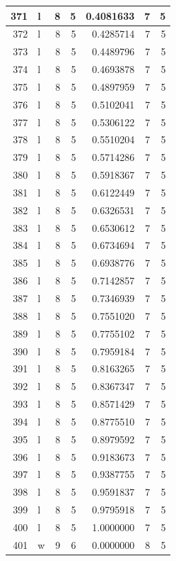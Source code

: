 \documentclass[
  letterpaper,
  DIV=11,
  numbers=noendperiod]{scrreprt}
\begin{document}
\begin{table}
\begin{tabular}[t]{r|l|r|r|r|r|r}
\hline
371 & l & 8 & 5 & 0.4081633 & 7 & 5\\
\hline
372 & l & 8 & 5 & 0.4285714 & 7 & 5\\
\hline
373 & l & 8 & 5 & 0.4489796 & 7 & 5\\
\hline
374 & l & 8 & 5 & 0.4693878 & 7 & 5\\
\hline
375 & l & 8 & 5 & 0.4897959 & 7 & 5\\
\hline
376 & l & 8 & 5 & 0.5102041 & 7 & 5\\
\hline
377 & l & 8 & 5 & 0.5306122 & 7 & 5\\
\hline
378 & l & 8 & 5 & 0.5510204 & 7 & 5\\
\hline
379 & l & 8 & 5 & 0.5714286 & 7 & 5\\
\hline
380 & l & 8 & 5 & 0.5918367 & 7 & 5\\
\hline
381 & l & 8 & 5 & 0.6122449 & 7 & 5\\
\hline
382 & l & 8 & 5 & 0.6326531 & 7 & 5\\
\hline
383 & l & 8 & 5 & 0.6530612 & 7 & 5\\
\hline
384 & l & 8 & 5 & 0.6734694 & 7 & 5\\
\hline
385 & l & 8 & 5 & 0.6938776 & 7 & 5\\
\hline
386 & l & 8 & 5 & 0.7142857 & 7 & 5\\
\hline
387 & l & 8 & 5 & 0.7346939 & 7 & 5\\
\hline
388 & l & 8 & 5 & 0.7551020 & 7 & 5\\
\hline
389 & l & 8 & 5 & 0.7755102 & 7 & 5\\
\hline
390 & l & 8 & 5 & 0.7959184 & 7 & 5\\
\hline
391 & l & 8 & 5 & 0.8163265 & 7 & 5\\
\hline
392 & l & 8 & 5 & 0.8367347 & 7 & 5\\
\hline
393 & l & 8 & 5 & 0.8571429 & 7 & 5\\
\hline
394 & l & 8 & 5 & 0.8775510 & 7 & 5\\
\hline
395 & l & 8 & 5 & 0.8979592 & 7 & 5\\
\hline
396 & l & 8 & 5 & 0.9183673 & 7 & 5\\
\hline
397 & l & 8 & 5 & 0.9387755 & 7 & 5\\
\hline
398 & l & 8 & 5 & 0.9591837 & 7 & 5\\
\hline
399 & l & 8 & 5 & 0.9795918 & 7 & 5\\
\hline
400 & l & 8 & 5 & 1.0000000 & 7 & 5\\
\hline
401 & w & 9 & 6 & 0.0000000 & 8 & 5\\

\end{tabular}
\end{table}
\end{document}
